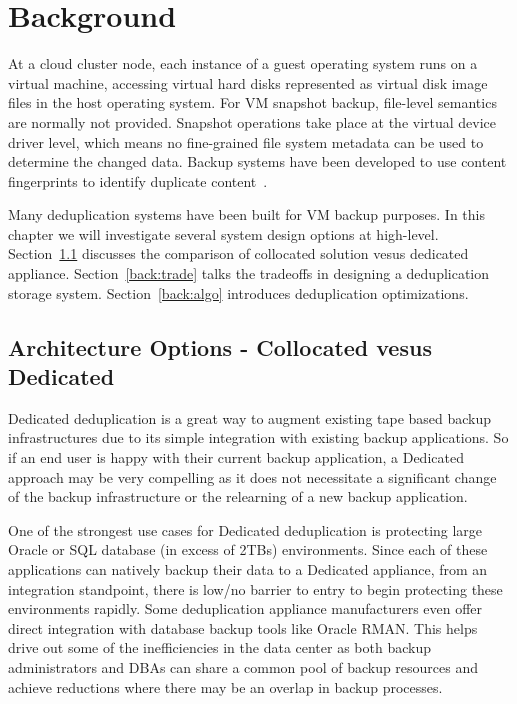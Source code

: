 \chapter{Background}
\label{chap:back}
At a cloud cluster node, each instance of a guest operating system runs on a virtual machine, accessing virtual hard disks 
represented as virtual disk image files in the host operating system.
For VM snapshot backup, file-level semantics are normally not provided.
Snapshot operations take place at the virtual device driver level, which
means no fine-grained file system metadata can be used to determine the changed data. 
Backup systems have been developed to use content fingerprints to identify duplicate
content~\cite{venti02,Rhea2008}.  

Many deduplication systems have been built for VM backup purposes. 
In this chapter we will investigate several system design options at high-level.
Section~\ref{back:coll} discusses the comparison of collocated solution vesus dedicated appliance.
Section~\ref{back:trade} talks the tradeoffs in designing a deduplication storage system.
Section~\ref{back:algo} introduces deduplication optimizations.

\section{Architecture Options - Collocated vesus Dedicated} 
\label{back:coll}
Dedicated deduplication is a great way to augment existing tape based backup infrastructures due to its simple integration with existing backup applications. So if an end user is happy with their current backup application, a Dedicated approach may be very compelling as it does not necessitate a significant change of the backup infrastructure or the relearning of a new backup application.

One of the strongest use cases for Dedicated deduplication is protecting large Oracle or SQL database (in excess of 2TBs) environments. Since each of these applications can natively backup their data to a Dedicated appliance, from an integration standpoint, there is low/no barrier to entry to begin protecting these environments rapidly. Some deduplication appliance manufacturers even offer direct integration with database backup tools like Oracle RMAN. This helps drive out some of the inefficiencies in the data center as both backup administrators and DBAs can share a common pool of backup resources and achieve reductions where there may be an overlap in backup processes.

